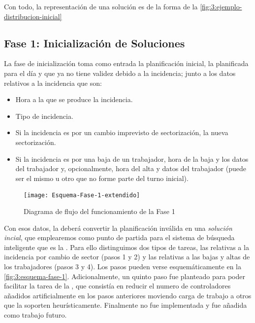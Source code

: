 Con todo, la representación de una solución es de la forma de la \autoref{fig:3:ejemplo-distribucion-inicial}

\subsection{Fase 1: Inicialización de Soluciones} \label{sec:3:inicializacion-soluciones}

La fase de inicialización toma como entrada la planificación inicial, la planificada para el día y que ya no tiene validez debido a la incidencia; junto a los datos relativos a la incidencia que son:

\begin{itemize}
	\item Hora a la que se produce la incidencia.
	\item Tipo de incidencia.
	\item Si la incidencia es por un cambio imprevisto de sectorización, la nueva sectorización.
	\item Si la incidencia es por una baja de un trabajador, hora de la baja y los datos del trabajador y, opcionalmente, hora del alta y datos del trabajador (puede ser el mismo u otro que no forme parte del turno inicial).
\end{itemize}

\begin{figure}[htbp]
	\centering
	\texttt{[image: Esquema-Fase-1-extendido]}
	\caption{Diagrama de flujo del funcionamiento de la Fase 1}
	\label{fig:3:esquema-fase-1}
\end{figure}

Con esos datos, la \faseuno{} deberá convertir la planificación inválida en una \textit{solución incial}, que 
emplearemos como punto de partida para el sistema de búsqueda inteligente que es la \fasedos{}. Para ello distinguimos dos tipos de tareas, las relativas a la incidencia por cambio de sector (pasos 1 y 2) y las relativas a las bajas y altas de los trabajadores (pasos 3 y 4). Los pasos pueden verse esquemáticamente en la \autoref{fig:3:esquema-fase-1}.
Adicionalmente, un quinto paso fue planteado para poder facilitar la tarea de la \fasedos{}, que consistía en reducir el numero de controladores añadidos artificialmente en los pasos anteriores moviendo carga de trabajo a otros que la soporten heurísticamente. Finalmente no fue implementada y fue añadida como trabajo futuro.
\\

